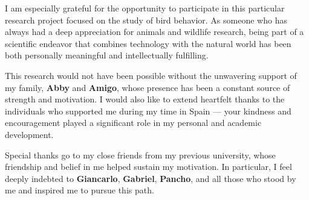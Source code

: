 I am especially grateful for the opportunity to participate in this particular research project focused on the study of bird behavior. As someone who has always had a deep appreciation for animals and wildlife research, being part of a scientific endeavor that combines technology with the natural world has been both personally meaningful and intellectually fulfilling.

This research would not have been possible without the unwavering support of my family, \textbf{Abby} and \textbf{Amigo}, whose presence has been a constant source of strength and motivation. I would also like to extend heartfelt thanks to the individuals who supported me during my time in Spain — your kindness and encouragement played a significant role in my personal and academic development.

Special thanks go to my close friends from my previous university, whose friendship and belief in me helped sustain my motivation. In particular, I feel deeply indebted to \textbf{Giancarlo}, \textbf{Gabriel}, \textbf{Pancho}, and all those who stood by me and inspired me to pursue this path.


\cleardoublepage %
